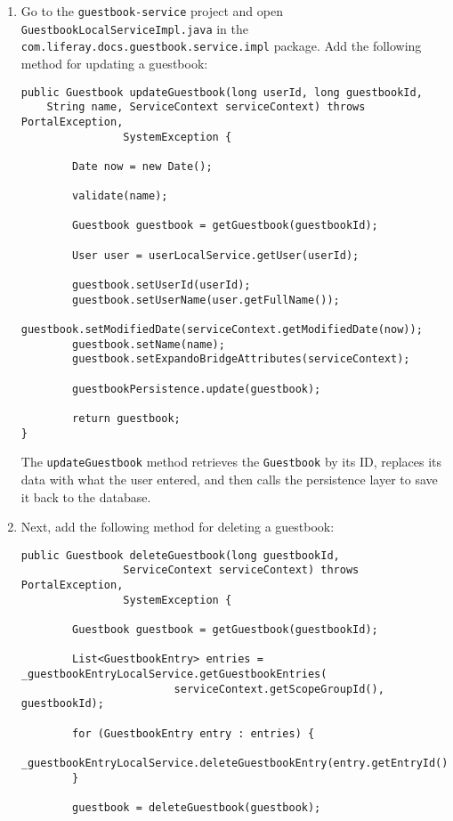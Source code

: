 \begin{enumerate}
\def\labelenumi{\arabic{enumi}.}
\item
  Go to the \texttt{guestbook-service} project and open
  \texttt{GuestbookLocalServiceImpl.java} in the
  \texttt{com.liferay.docs.guestbook.service.impl} package. Add the
  following method for updating a guestbook:

\begin{verbatim}
public Guestbook updateGuestbook(long userId, long guestbookId,
    String name, ServiceContext serviceContext) throws PortalException,
                SystemException {

        Date now = new Date();

        validate(name);

        Guestbook guestbook = getGuestbook(guestbookId);

        User user = userLocalService.getUser(userId);

        guestbook.setUserId(userId);
        guestbook.setUserName(user.getFullName());
        guestbook.setModifiedDate(serviceContext.getModifiedDate(now));
        guestbook.setName(name);
        guestbook.setExpandoBridgeAttributes(serviceContext);

        guestbookPersistence.update(guestbook);

        return guestbook;
}
\end{verbatim}

  The \texttt{updateGuestbook} method retrieves the \texttt{Guestbook}
  by its ID, replaces its data with what the user entered, and then
  calls the persistence layer to save it back to the database.
\item
  Next, add the following method for deleting a guestbook:

\begin{verbatim}
public Guestbook deleteGuestbook(long guestbookId,
                ServiceContext serviceContext) throws PortalException,
                SystemException {

        Guestbook guestbook = getGuestbook(guestbookId);

        List<GuestbookEntry> entries = _guestbookEntryLocalService.getGuestbookEntries(
                        serviceContext.getScopeGroupId(), guestbookId);

        for (GuestbookEntry entry : entries) {
                _guestbookEntryLocalService.deleteGuestbookEntry(entry.getEntryId());
        }

        guestbook = deleteGuestbook(guestbook);


\end{verbatim}
\end{enumerate}
